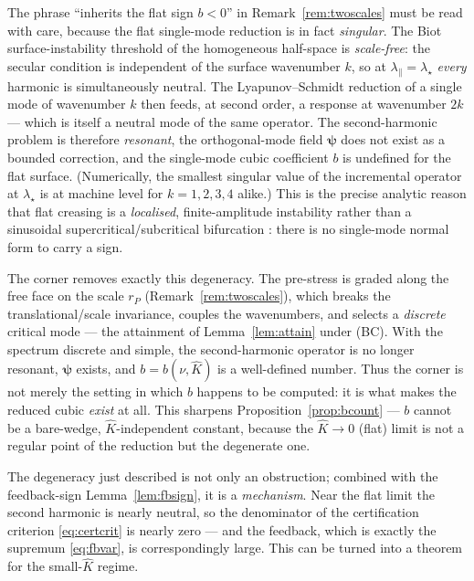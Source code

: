 \begin{remark}
    \label{rem:flatdegenerate}
    The phrase ``inherits the flat sign $b<0$'' in Remark~\ref{rem:twoscales} must be read with care, because the flat
    single-mode reduction is in fact \emph{singular}. The Biot surface-instability threshold of the homogeneous
    half-space is \emph{scale-free}: the secular condition is independent of the surface wavenumber $k$, so at
    $\lambda_\parallel=\lambda_\star$ \emph{every} harmonic is simultaneously neutral. The Lyapunov--Schmidt reduction of
    a single mode of wavenumber $k$ then feeds, at second order, a response at wavenumber $2k$ --- which is itself a
    neutral mode of the same operator. The second-harmonic problem is therefore \emph{resonant}, the orthogonal-mode
    field $\bm\psi$ does not exist as a bounded correction, and the single-mode cubic coefficient $b$ is undefined for the
    flat surface. (Numerically, the smallest singular value of the incremental operator at $\lambda_\star$ is at machine
    level for $k=1,2,3,4$ alike.) This is the precise analytic reason that flat creasing is a \emph{localised},
    finite-amplitude instability rather than a sinusoidal supercritical/subcritical bifurcation
    \cite{Hong2009}: there is no single-mode normal form to carry a sign.

    The corner removes exactly this degeneracy. The pre-stress is graded along the free face on the scale $r_P$
    (Remark~\ref{rem:twoscales}), which breaks the translational/scale invariance, couples the wavenumbers, and selects a
    \emph{discrete} critical mode --- the attainment of Lemma~\ref{lem:attain} under (BC). With the spectrum discrete and
    simple, the second-harmonic operator is no longer resonant, $\bm\psi$ exists, and $b=b(\nu,\hat K)$ is a well-defined
    number. Thus the corner is not merely the setting in which $b$ happens to be computed: it is what makes the reduced
    cubic \emph{exist} at all. This sharpens Proposition~\ref{prop:bcount} --- $b$ cannot be a bare-wedge, $\hat
        K$-independent constant, because the $\hat K\to0$ (flat) limit is not a regular point of the reduction but the
    degenerate one.
\end{remark}

The degeneracy just described is not only an obstruction; combined with the feedback-sign
Lemma~\ref{lem:fbsign}, it is a \emph{mechanism}. Near the flat limit the second harmonic is nearly neutral, so the
denominator of the certification criterion \eqref{eq:certcrit} is nearly zero --- and the feedback, which is exactly
the supremum \eqref{eq:fbvar}, is correspondingly large. This can be turned into a theorem for the small-$\hat K$
regime.

